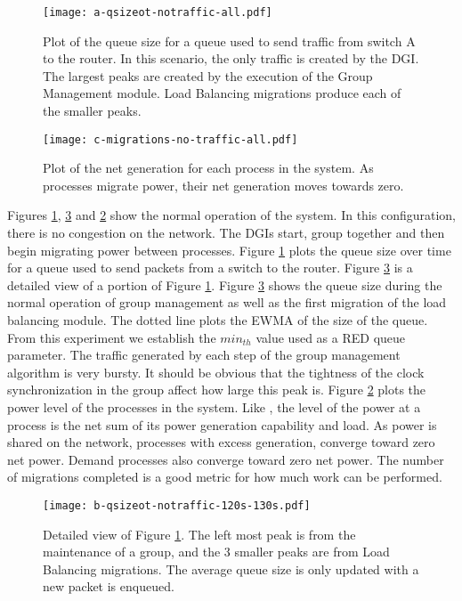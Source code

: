 \begin{figure}
\texttt{[image: a-qsizeot-notraffic-all.pdf]}
\caption{Plot of the queue size for a queue used to send traffic from switch A to the router. In this scenario, the only traffic is created by the \ac{DGI}. The largest peaks are created by the execution of the Group Management module. Load Balancing migrations produce each of the smaller peaks.}
\label{fig:plota}
\end{figure}


\begin{figure}
\texttt{[image: c-migrations-no-traffic-all.pdf]}
\caption{Plot of the net generation for each process in the system. As processes migrate power, their net generation moves towards zero.}
\label{fig:plotc}
\end{figure}

Figures \ref{fig:plota}, \ref{fig:plotb} and \ref{fig:plotc} show the normal operation of the system.
In this configuration, there is no congestion on the network. 
The \ac{DGI}s start, group together and then begin migrating power between processes.
Figure \ref{fig:plota} plots the queue size over time for a queue used to send packets from a switch to the router.
Figure \ref{fig:plotb} is a detailed view of a portion of Figure \ref{fig:plota}.
Figure \ref{fig:plotb} shows the queue size during the normal operation of group management as well as the first migration of the load balancing module.
The dotted line plots the \ac{EWMA} of the size of the queue.
From this experiment we establish the $min_{th}$ value used as a \ac{RED} queue parameter.
The traffic generated by each step of the group management algorithm is very bursty.
It should be obvious that the tightness of the clock synchronization in the group affect how large this peak is.
Figure \ref{fig:plotc} plots the power level of the processes in the system.
Like \cite{HILTESTBED}, the level of the power at a process is the net sum of its power generation capability and load.
As power is shared on the network, processes with excess generation, converge toward zero net power.
Demand processes also converge toward zero net power.
The number of migrations completed is a good metric for how much work can be performed.

\begin{figure}
\texttt{[image: b-qsizeot-notraffic-120s-130s.pdf]}
\caption{Detailed view of Figure \ref{fig:plota}. The left most peak is from the maintenance of a group, and the 3 smaller peaks are from Load Balancing migrations. The average queue size is only updated with a new packet is enqueued.}
\label{fig:plotb}
\end{figure}

